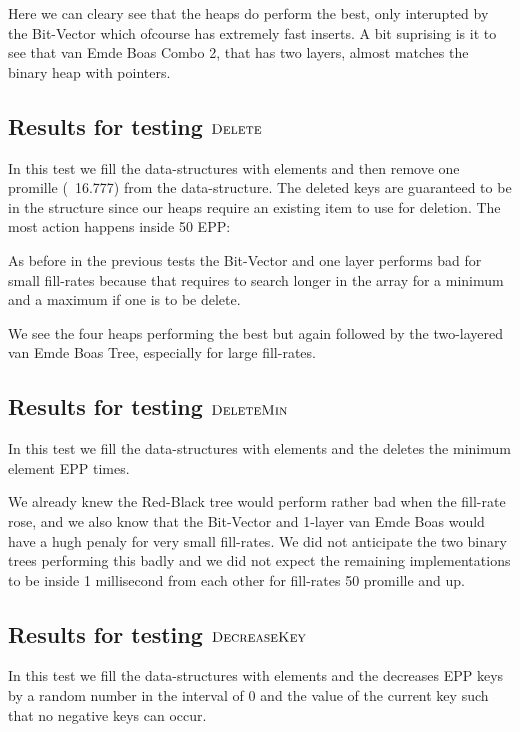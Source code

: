 \documentclass[oneside,11pt,openright]{report}
\newcommand{\DeleteMin}{\textsc{DeleteMin}}
\newcommand{\DecreaseKey}{\textsc{DecreaseKey}}
\newcommand{\Delete}{\textsc{Delete}}
\begin{document}


Here we can cleary see that the heaps do perform the best, only interupted by the Bit-Vector which ofcourse has extremely fast inserts. A bit suprising is it to see that van Emde Boas Combo 2, that has two layers, almost matches the binary heap with pointers.

\subsection{Results for testing $\Delete$}

In this test we fill the data-structures with elements and then remove one promille (~16.777) from the data-structure. The deleted keys are guaranteed to be in the structure since our heaps require an existing item to use for deletion. The most action happens inside 50 EPP:



As before in the previous tests the Bit-Vector and one layer performs bad for small fill-rates because that requires to search longer in the array for a minimum and a maximum if one is to be delete.

We see the four heaps performing the best but again followed by the two-layered van Emde Boas Tree, especially for large fill-rates.

\subsection{Results for testing $\DeleteMin$}

In this test we fill the data-structures with elements and the deletes the minimum element EPP times.



We already knew the Red-Black tree would perform rather bad when the fill-rate rose, and we also know that the Bit-Vector and 1-layer van Emde Boas would have a hugh penaly for very small fill-rates. We did not anticipate the two binary trees performing this badly and we did not expect the remaining implementations to be inside 1 millisecond from each other for fill-rates 50 promille and up.

\subsection{Results for testing $\DecreaseKey$}

In this test we fill the data-structures with elements and the decreases EPP keys by a random number in the interval of 0 and the value of the current key such that no negative keys can occur.
\end{document}
